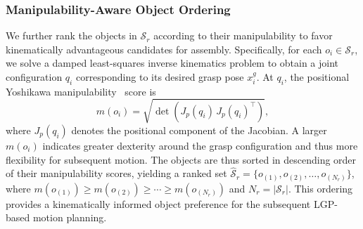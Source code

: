 \documentclass[letterpaper, 10 pt, conference]{ieeeconf}  %
\begin{document}



\subsubsection{Manipulability-Aware Object Ordering}

We further rank the objects in $\mathcal{S}_{r}$ according to their manipulability to favor kinematically advantageous candidates for assembly.
Specifically, for each $o_i \in \mathcal{S}_{r}$, we solve a damped least-squares inverse kinematics problem to obtain a joint configuration $q_i$ corresponding to its desired grasp pose $x_i^{g}$. 
At $q_i$, the positional Yoshikawa manipulability~\cite{yoshikawa1985manipulability} score is
\begin{equation}
  m(o_i) = \sqrt{\det \left(J_p(q_i)\,J_p(q_i)^\top\right)},
  \label{eq:manip}
\end{equation}
where $J_p(q_i)$ denotes the positional component of the Jacobian. 
A larger $m(o_i)$ indicates greater dexterity around the grasp configuration and thus more flexibility for subsequent motion.
The objects are thus sorted in descending order of their manipulability scores, yielding a ranked set $\hat{\mathcal{S}}_r = \{o_{(1)}, o_{(2)}, \ldots, o_{(N_r)}\}$, where $ m(o_{(1)}) \geq m(o_{(2)}) \geq \cdots \geq m(o_{(N_r)})$ and $N_r=|\mathcal{S}_r|$. 
This ordering provides a kinematically informed object preference for the subsequent LGP-based motion planning.
\end{document}
